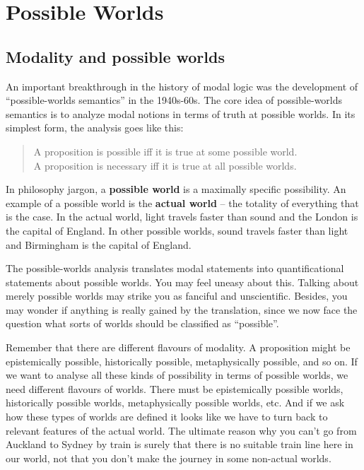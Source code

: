 \chapter{Possible Worlds}\label{ch:worlds}

\section{Modality and possible worlds}

An important breakthrough in the history of modal logic was the development of
``possible-worlds semantics'' in the 1940s-60s.
%
%
The core idea of possible-worlds semantics is to analyze modal notions in
terms of truth at possible worlds. In its simplest form, the analysis goes like
this:
%
\begin{quote}
  A proposition is possible iff it is true at some possible world.\\
  A proposition is necessary iff it is true at all possible worlds.
\end{quote}

In philosophy jargon, a \textbf{possible world} is a maximally specific
possibility. An example of a possible world is the \textbf{actual world} -- the
totality of everything that is the case. In the actual world, light travels
faster than sound and the London is the capital of England. In other possible
worlds, sound travels faster than light and Birmingham is the capital of
England.

The possible-worlds analysis translates modal statements into quantificational
statements about possible worlds. You may feel uneasy about this. Talking about
merely possible worlds may strike you as fanciful and unscientific. Besides, you
may wonder if anything is really gained by the translation, since we now face
the question what sorts of worlds should be classified as ``possible''.

Remember that there are different flavours of modality. A proposition might be
epistemically possible, historically possible, metaphysically possible, and so
on. If we want to analyse all these kinds of possibility in terms of possible
worlds, we need different flavours of worlds. There must be epistemically
possible worlds, historically possible worlds, metaphysically possible worlds,
etc. And if we ask how these types of worlds are defined it looks like we have
to turn back to relevant features of the actual world. The ultimate reason why
you can't go from Auckland to Sydney by train is surely that there is no
suitable train line here in our world, not that you don't make the journey in
some non-actual worlds.

